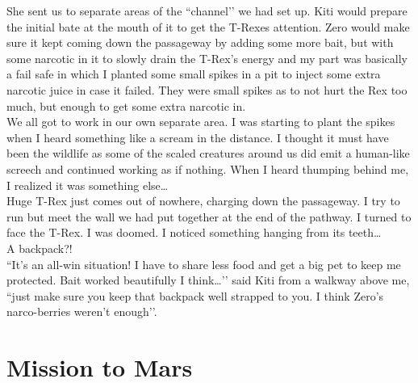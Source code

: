 \documentclass[a4paper,onecolumn,11pt]{article}
\begin{document}
\newline
She sent us to separate areas of the ``channel’’ we had set up. Kiti would prepare the initial bate at the mouth of it to get the T-Rexes attention. Zero would make sure it kept coming down the passageway by adding some more bait, but with some narcotic in it to slowly drain the T-Rex’s energy and my part was basically a fail safe in which I planted some small spikes in a pit to inject some extra narcotic juice in case it failed. They were small spikes as to not hurt the Rex too much, but enough to get some extra narcotic in.\\
\newline
We all got to work in our own separate area. I was starting to plant the spikes when I heard something like a scream in the distance. I thought it must have been the wildlife as some of the scaled creatures around us did emit a human-like screech and continued working as if nothing. When I heard thumping behind me, I realized it was something else\ldots \\
\newline
Huge T-Rex just comes out of nowhere, charging down the passageway. I try to run but meet the wall we had put together at the end of the pathway. I turned to face the T-Rex. I was doomed. I noticed something hanging from its teeth\ldots \\
\newline
A backpack?!\\
\newline
``It’s an all-win situation! I have to share less food and get a big pet to keep me protected. Bait worked beautifully I think…’’ said Kiti from a walkway above me, ``just make sure you keep that backpack well strapped to you. I think Zero’s narco-berries weren’t enough’’.

\newpage


\section{Mission to Mars}
\end{document}
